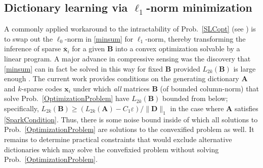 \subsection{Dictionary learning via $\ell_1$-norm minimization}

A commonly applied workaround to the intractability of Prob.~\ref{SLCopt} (see \cite{tillmann2015computational}) is to swap out the $\ell_0$-norm in \eqref{minsum} for $\ell_1$-norm, thereby transforming the inference of sparse $\mathbf{\overline x}_i$ for a given $\mathbf{B}$ into a convex optimization solvable by a linear program. A major advance in compressive sensing was the discovery that \eqref{minsum} can in fact be solved in this way for fixed $\mathbf{B}$ provided $L_{2k}(\mathbf{B})$ is large enough \cite{eldar2012compressed}. The current work provides conditions on the generating dictionary $\mathbf{A}$ and $k$-sparse codes $\mathbf{x}_i$ under which \emph{all} matrices $\mathbf{B}$ (of bounded column-norm) that solve Prob.~\ref{OptimizationProblem} have $L_{2k}(\mathbf{B})$ bounded from below; specifically, $L_{2k}(\mathbf{B}) \geq \left(L_{2k}(\mathbf{A}) - C_1\varepsilon \right) / \|\mathbf{D}\|_1$ in the case where $\mathbf{A}$ satisfies \eqref{SparkCondition}. Thus, there is some noise bound inside of which all solutions to Prob.~\ref{OptimizationProblem} are solutions to the convexified problem as well. It remains to determine practical constraints that would exclude alternative dictionaries which may solve the convefixied problem without solving Prob.~\ref{OptimizationProblem}. 



